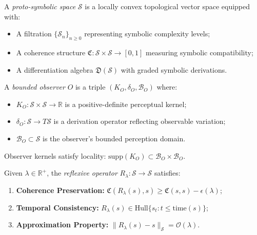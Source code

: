 \begin{definition}
\label{definition:bk4_proto_symbolic_space}
A \emph{proto-symbolic space} $\mathcal{S}$ is a locally convex topological vector space equipped with:
\begin{itemize}
    \item A filtration $\{ \mathcal{S}_n \}_{n \geq 0}$ representing symbolic complexity levels;
    \item A coherence structure $\mathfrak{C} : \mathcal{S} \times \mathcal{S} \to [0,1]$ measuring symbolic compatibility;
    \item A differentiation algebra $\mathfrak{D}(\mathcal{S})$ with graded symbolic derivations.
\end{itemize}
\end{definition}

\begin{definition}
\label{definition:bk4_bounded_observer}
A \emph{bounded observer} $O$ is a triple $(K_O, \delta_O, \mathcal{B}_O)$ where:
\begin{itemize}
    \item $K_O : \mathcal{S} \times \mathcal{S} \to \mathbb{R}$ is a positive-definite perceptual kernel;
    \item $\delta_O : \mathcal{S} \to T\mathcal{S}$ is a derivation operator reflecting observable variation;
    \item $\mathcal{B}_O \subset \mathcal{S}$ is the observer’s bounded perception domain.
\end{itemize}
\end{definition}

\begin{axiom}
\label{axiom:bk4_observer_locality}
Observer kernels satisfy locality: $\mathrm{supp}(K_O) \subset \mathcal{B}_O \times \mathcal{B}_O$.
\end{axiom}

\begin{definition}
\label{definition:bk4_reflexive_operator}
Given $\lambda \in \mathbb{R}^+$, the \emph{reflexive operator} $R_\lambda : \mathcal{S} \to \mathcal{S}$ satisfies:
\begin{enumerate}
    \item \textbf{Coherence Preservation:} $\mathfrak{C}(R_\lambda(s), s) \geq \mathfrak{C}(s, s) - \epsilon(\lambda)$;
    \item \textbf{Temporal Consistency:} $R_\lambda(s) \in \text{Hull}\{s_t : t \leq \mathrm{time}(s)\}$;
    \item \textbf{Approximation Property:} $\| R_\lambda(s) - s \|_{\mathcal{S}} = \mathcal{O}(\lambda)$.
\end{enumerate}
\end{definition}

